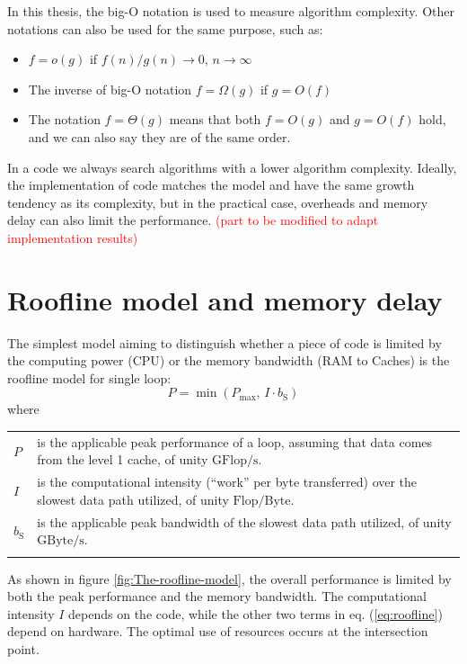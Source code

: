 In this thesis, the big-O notation is used to measure algorithm complexity.
Other notations can also be used for the same purpose, such as:
\begin{itemize}
\item $f=o(g)$ if $f(n)/g(n)\rightarrow0$, $n\rightarrow\infty$
\item The inverse of big-O notation $f=\Omega(g)$ if $g=O(f)$
\item The notation $f=\Theta(g)$ means that both $f=O(g)$ and $g=O(f)$
hold, and we can also say they are of the same order.
\end{itemize}
In a code we always search algorithms with a lower algorithm complexity.
Ideally, the implementation of code matches the model and have the
same growth tendency as its complexity, but in the practical case,
overheads and memory delay can also limit the performance. \textcolor{red}{(part
to be modified to adapt implementation results)}

\section{Roofline model and memory delay}

The simplest model aiming to distinguish whether a piece of code is
limited by the computing power (CPU) or the memory bandwidth (RAM
to Caches) is the roofline model \citep{Williams_2009_roofline} for
single loop:
\begin{equation}
P=\min\left(P_{\max},\,I\cdot b_{\mathrm{S}}\right)\label{eq:roofline}
\end{equation}
where

\begin{tabular}{l>{\raggedright}p{}}
$P$ & is the applicable peak performance of a loop, assuming that data comes
from the level 1 cache, of unity $\mathrm{GFlop/s}$. \tabularnewline
$I$ & is the computational intensity (“work” per byte transferred) over
the slowest data path utilized, of unity $\mathrm{Flop/Byte}$. \tabularnewline
$b_{\mathrm{S}}$ & is the applicable peak bandwidth of the slowest data path utilized,
of unity $\mathrm{GByte/s}$.\tabularnewline
 & \tabularnewline
\end{tabular}

As shown in figure \ref{fig:The-roofline-model}, the overall performance
is limited by both the peak performance and the memory bandwidth.
The computational intensity $I$ depends on the code, while the other
two terms in eq. (\ref{eq:roofline}) depend on hardware. The optimal
use of resources occurs at the intersection point.

